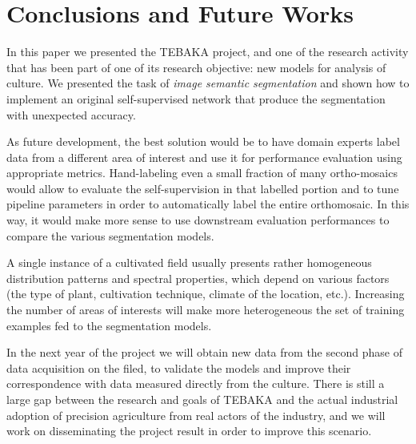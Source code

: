 \documentclass[comsoc,final]{IEEEtran}
\begin{document}
\section{Conclusions and Future Works}\label{sec:conclusion}

In this paper we presented the TEBAKA project, and one of the research activity that has been part of one of its research objective: new models for analysis of culture. We presented the task of \emph{image semantic segmentation} and shown how to implement an original self-supervised network that produce the segmentation with unexpected accuracy. 

 As future development, the best solution would be to have domain experts label data from a different area of interest and use it for performance evaluation using appropriate metrics. Hand-labeling even a small fraction of many ortho-mosaics would allow to evaluate the self-supervision in that labelled portion and to tune pipeline parameters in order to automatically label the entire orthomosaic. In this way, it would make more sense to use downstream evaluation performances to compare the various segmentation models. 
 
 A single instance of a cultivated field usually presents rather homogeneous distribution patterns and spectral properties, which depend on various factors (the type of plant, cultivation technique, climate of the location, etc.). Increasing the number of areas of interests will make more heterogeneous the set of training examples fed to the segmentation models.

In the next year of the project we will obtain new data from the second phase of data acquisition on the filed, to validate the models and improve their correspondence with data measured directly from the culture. There is still a large gap between the research and goals of TEBAKA and the actual industrial adoption of precision agriculture from real actors of the industry, and we will work on disseminating the project result in order to improve this scenario.

\printbibliography
\end{document}
